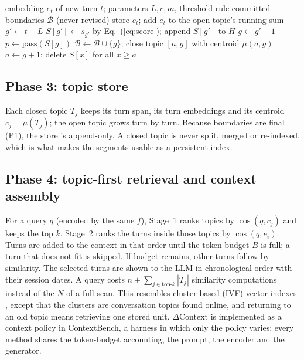 \documentclass[journal]{IEEEtran}
\newcommand{\dc}{$\Delta$Context}
\begin{document}
\begin{algorithm}[t]
\caption{\dc{} delayed-commitment segmentation (per turn)}
\label{alg:dc}
\begin{algorithmic}[1]
\Require embedding $e_t$ of new turn $t$; parameters $L, c, m$, threshold rule
\Ensure committed boundaries $\mathcal{B}$ (never revised)
\State store $e_t$; add $e_t$ to the open topic's running sum
\State $g' \gets t-L$ 
  \State $S[g'] \gets s_{g'}$ by Eq.~(\ref{eq:score}); append $S[g']$ to $H$
\EndIf
\State $g \gets g'-1$ 
  \State \Return
\EndIf
\State $p \gets \mathrm{pass}(S[g])$ 
  \State $\mathcal{B}\gets\mathcal{B}\cup\{g\}$; close topic $[a,g]$ with centroid $\mu(a,g)$
  \State $a \gets g+1$; delete $S[x]$ for all $x\ge a$
\EndIf
\end{algorithmic}
\end{algorithm}

\subsection{Phase 3: topic store}
Each closed topic $T_j$ keeps its turn span, its turn embeddings and its
centroid $c_j=\mu(T_j)$; the open topic grows turn by turn. Because
boundaries are final (P1), the store is append-only. A closed topic is never
split, merged or re-indexed, which is what makes the segments usable as a
persistent index.

\subsection{Phase 4: topic-first retrieval and context assembly}
For a query $q$ (encoded by the same $f$), Stage~1 ranks topics by
$\cos(q,c_j)$ and keeps the top $k$. Stage~2 ranks the turns inside those
topics by $\cos(q,e_i)$. Turns are added to the context in that order until
the token budget $B$ is full; a turn that does not fit is skipped. If budget
remains, other turns follow by similarity. The selected turns are shown to the
LLM in chronological order with their session dates. A query costs $n+\sum_{j\in
\mathrm{top}\text{-}k}|T_j|$ similarity computations instead of the $N$ of a
full scan. This resembles cluster-based (IVF) vector indexes
\cite{pan2024vectordb}, except that the clusters are conversation topics found
online, and returning to an old topic means retrieving one stored unit.
\dc{} is implemented as a context policy in ContextBench, a harness in which
only the policy varies: every method shares the token-budget accounting, the
prompt, the encoder and the generator.
\end{document}
